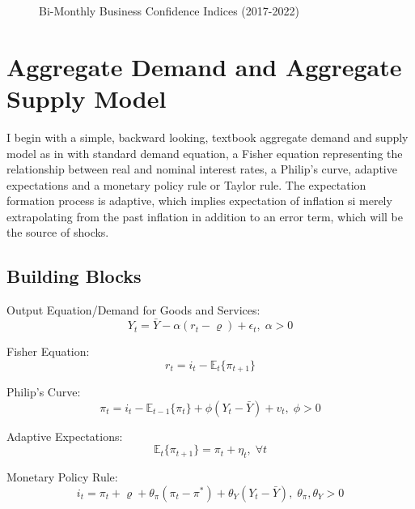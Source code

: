\documentclass[12pt]{article}
\newcommand{\1}{\mathbbm 1}
\renewcommand{\rho}{\varrho}
\begin{document}
\begin{figure}[H]
	\centering
	\scalebox{0.8}{}
	\caption[]{Bi-Monthly Business Confidence Indices (2017-2022)}
\end{figure}


		
		
		\section{Aggregate Demand and Aggregate Supply Model}
		
		 I begin with a simple, backward looking, textbook aggregate demand and supply model as in \cite{abel2017macroeconomics} with standard demand equation, a Fisher equation representing the relationship between real and nominal interest rates, a Philip's curve, adaptive expectations and a monetary policy rule or Taylor rule. The expectation formation process is adaptive, which implies expectation of inflation si merely extrapolating from the past inflation in addition to an error term, which will be the source of shocks.
		
		\subsection{Building Blocks}
		
		Output Equation/Demand for Goods and Services: 
		\begin{equation}
			Y_{t} = \bar{Y} - \alpha (r_{t} - \rho) + \epsilon_{t}, \; \alpha > 0
		\end{equation}
	
	
	Fisher Equation: 
	\begin{equation}
		r_{t} = i_{t} - \mathbb{E}_{t}\{\pi_{t+1}\}
	\end{equation}
		
		Philip's Curve: 
		\begin{equation}
			\pi_{t} = i_{t} - \mathbb{E}_{t-1}\{\pi_{t}\} + \phi(Y_{t} - \bar{Y}) + v_{t}, \; \phi > 0
		\end{equation}
		
		Adaptive Expectations:
		\begin{equation}
			\mathbb{E}_{t}\{\pi_{t+1}\} = \pi_{t} + \eta_{t}, \; \forall t
		\end{equation}
	
	Monetary Policy Rule:
	\begin{equation}
		i_{t} = \pi_{t} + \rho + \theta_{\pi} (\pi_{t} - \pi^{*}) + \theta_{Y} (Y_{t} - \bar{Y}), \; \theta_{\pi}, \theta_{Y} > 0
	\end{equation}
\end{document}
